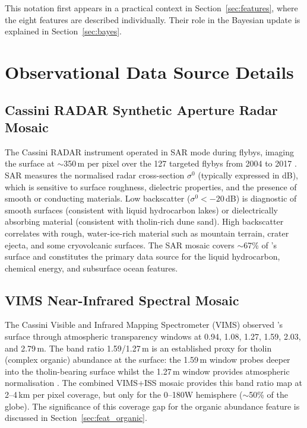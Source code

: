 This notation first appears in a practical context in Section~\ref{sec:features},
where the eight features are described individually.  Their role in the
Bayesian update is explained in Section~\ref{sec:bayes}.


\section{Observational Data Source Details}
\label{app:data_sources}
\label{sec:data_sources}

\subsection{Cassini RADAR Synthetic Aperture Radar Mosaic}
\label{sec:sar_data}

The Cassini RADAR instrument operated in SAR mode during \titan{} flybys,
imaging the surface at $\sim$350\,m per pixel over the 127 targeted flybys
from 2004 to 2017 \citep{Elachi2004}.  SAR measures the normalised radar
cross-section $\sigma^0$ (typically expressed in dB), which is sensitive to
surface roughness, dielectric properties, and the presence of smooth or
conducting materials.  Low backscatter ($\sigma^0 < -20$\,dB) is
diagnostic of smooth surfaces (consistent with liquid hydrocarbon lakes) or
dielectrically absorbing material (consistent with tholin-rich dune sand).
High backscatter correlates with rough, water-ice-rich material such as
mountain terrain, crater ejecta, and some cryovolcanic surfaces.  The SAR
mosaic covers $\sim$67\% of \titan{}'s surface and constitutes the primary
data source for the liquid hydrocarbon, chemical energy, and subsurface ocean
features.

\subsection{VIMS Near-Infrared Spectral Mosaic}
\label{sec:vims_data}

The Cassini Visible and Infrared Mapping Spectrometer (VIMS) observed \titan{}'s
surface through atmospheric transparency windows at 0.94, 1.08, 1.27, 1.59,
2.03, and 2.79\,\textmu{}m.  The band ratio 1.59/1.27\,\textmu{}m is an
established proxy for tholin (complex organic) abundance at the surface: the
1.59\,\textmu{}m window probes deeper into the tholin-bearing surface whilst
the 1.27\,\textmu{}m window provides atmospheric normalisation \citep{Barnes2007}.
The \citet{Seignovert2019CaltechDATA} combined VIMS+ISS mosaic
provides this band ratio map at 2--4\,km per pixel coverage, but only
for the 0--180\textdegree{}W hemisphere ($\sim$50\% of the globe).  The
significance of this coverage gap for the organic abundance feature is
discussed in Section~\ref{sec:feat_organic}.

